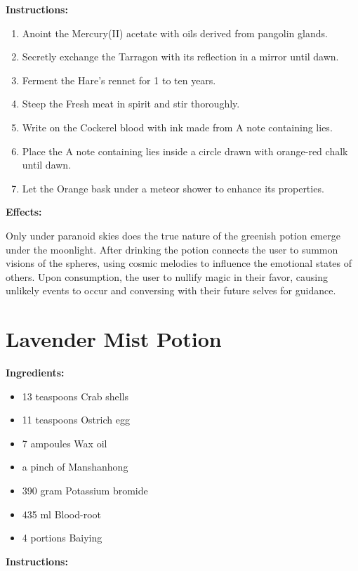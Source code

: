 \documentclass{article}
\begin{document}
\textbf{Instructions:}

\begin{enumerate}
  \item Anoint the Mercury(II) acetate with oils derived from pangolin glands.
  \item Secretly exchange the Tarragon with its reflection in a mirror until dawn.
  \item Ferment the Hare's rennet for 1 to ten years.
  \item Steep the Fresh meat in spirit and stir thoroughly.
  \item Write on the Cockerel blood with ink made from A note containing lies.
  \item Place the A note containing lies inside a circle drawn with orange-red chalk until dawn.
  \item Let the Orange bask under a meteor shower to enhance its properties.
\end{enumerate}

\textbf{Effects:}

Only under paranoid skies does the true nature of the greenish potion emerge under the moonlight. After drinking the potion connects the user to summon visions of the spheres, using cosmic melodies to influence the emotional states of others. Upon consumption, the user to nullify magic in their favor, causing unlikely events to occur and conversing with their future selves for guidance.

\newpage
\section*{Lavender Mist Potion}

\textbf{Ingredients:}

\begin{itemize}
  \item 13 teaspoons Crab shells
  \item 11 teaspoons Ostrich egg
  \item 7 ampoules Wax oil
  \item a pinch of Manshanhong
  \item 390 gram Potassium bromide
  \item 435 ml Blood-root
  \item 4 portions Baiying
\end{itemize}

\textbf{Instructions:}
\end{document}
